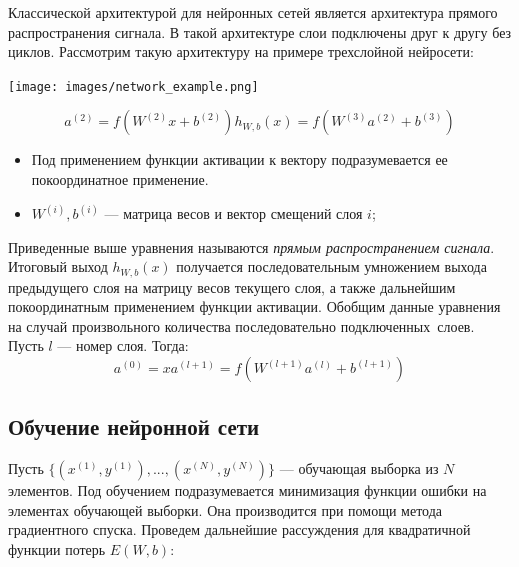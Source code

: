 \documentclass[14pt, a4paper]{extarticle}
\begin{document}
Классической архитектурой для нейронных сетей является архитектура прямого распространения сигнала. В такой архитектуре слои подключены друг к другу без циклов. Рассмотрим такую архитектуру на примере трехслойной нейросети:
\begin{center}
	\texttt{[image: images/network\_example.png]}
\end{center}
\begin{subequations}
\begin{equation*}
	a^{(2)} = f(W^{(2)}x + b^{(2)})
\end{equation*}
\begin{equation*}
	h_{W, b}(x) = f(W^{(3)}a^{(2)} + b^{(3)})
\end{equation*}
\end{subequations}
\begin{itemize}
\item Под применением функции активации к вектору подразумевается ее покоординатное применение.
\item $W^{(i)}, b^{(i)}$ — матрица весов и вектор смещений слоя $i$;
\end{itemize}

Приведенные выше уравнения называются \textit{прямым распространением сигнала}. Итоговый выход $h_{W, b}(x)$ получается последовательным умножением выхода предыдущего слоя на матрицу весов текущего слоя, а также дальнейшим покоординатным применением функции активации. Обобщим данные уравнения на случай произвольного количества последовательно подключенных~слоев. Пусть $l$ — номер слоя. Тогда:
\begin{subequations}
\begin{equation*}
	a^{(0)} = x
\end{equation*}
\begin{equation*}
	a^{(l+1)} = f(W^{(l+1)}a^{(l)} + b^{(l+1)})
\end{equation*}
\end{subequations}

\subsection*{Обучение нейронной сети}
Пусть $\{(x^{(1)}, y^{(1)}), ..., (x^{(N)}, y^{(N)})\}$ — обучающая выборка из $N$ элементов. Под обучением подразумевается минимизация функции ошибки на элементах обучающей выборки. Она производится при помощи метода градиентного спуска. Проведем дальнейшие рассуждения для квадратичной функции потерь $E(W, b)$:
\end{document}
